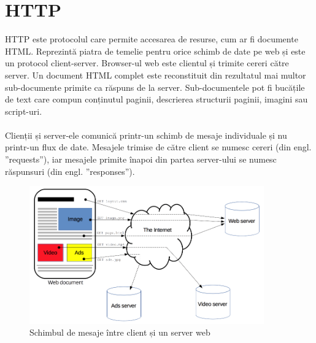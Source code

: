 \section{HTTP}
HTTP este protocolul care permite accesarea de resurse, cum ar fi documente HTML. Reprezintă piatra de temelie pentru orice schimb de date pe web și este un protocol client-server. Browser-ul web este clientul și trimite cereri către server. Un document HTML complet este reconstituit din rezultatul mai multor sub-documente primite ca răspuns de la server. Sub-documentele pot fi bucățile de text care compun conținutul paginii, descrierea structurii paginii, imagini sau script-uri.
\\ \\
Clienții și server-ele comunică printr-un schimb de mesaje individuale și nu printr-un flux de date. Mesajele trimise de către client se numesc cereri (din engl. ”requests”), iar mesajele primite înapoi din partea server-ului se numesc răspunsuri (din engl. ”responses”).

\begin{figure}[!htb]
	\centering
	\includegraphics[width=0.9\textwidth]
	{../LaTeX/Images/http_fetch.PNG}
	\caption{Schimbul de mesaje între client și un server web}
	\label{fig:21}
\end{figure}

